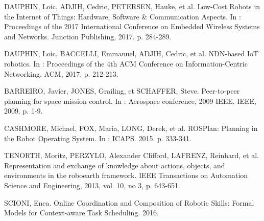 
DAUPHIN, Loic, ADJIH, Cedric, PETERSEN, Hauke, et al. 
Low-Cost Robots in the Internet of Things: Hardware, Software \& Communication Aspects. 
In : Proceedings of the 2017 International Conference on Embedded Wireless Systems and Networks. Junction Publishing, 2017. p. 284-289.

DAUPHIN, Loic, BACCELLI, Emmanuel, ADJIH, Cedric, et al. 
NDN-based IoT robotics. 
In : Proceedings of the 4th ACM Conference on Information-Centric Networking. ACM, 2017. p. 212-213.

BARREIRO, Javier, JONES, Grailing, et SCHAFFER, Steve. 
Peer-to-peer planning for space mission control. 
In : Aerospace conference, 2009 IEEE. IEEE, 2009. p. 1-9.

CASHMORE, Michael, FOX, Maria, LONG, Derek, et al. 
ROSPlan: Planning in the Robot Operating System. 
In : ICAPS. 2015. p. 333-341.

TENORTH, Moritz, PERZYLO, Alexander Clifford, LAFRENZ, Reinhard, et al. 
Representation and exchange of knowledge about actions, objects, and environments in the roboearth framework. 
IEEE Transactions on Automation Science and Engineering, 2013, vol. 10, no 3, p. 643-651.

SCIONI, Enea. 
Online Coordination and Composition of Robotic Skills: Formal Models for Context-aware Task Scheduling. 
2016.
